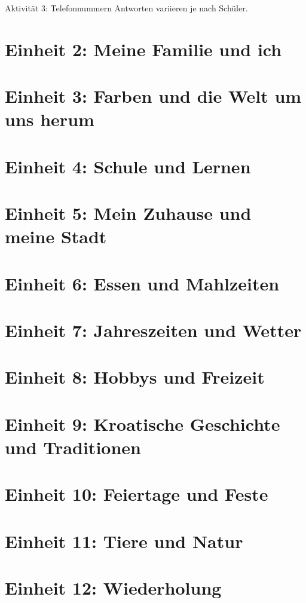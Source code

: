 Aktivität 3: Telefonnummern
Antworten variieren je nach Schüler.

\section{Einheit 2: Meine Familie und ich}

\section{Einheit 3: Farben und die Welt um uns herum}

\section{Einheit 4: Schule und Lernen}

\section{Einheit 5: Mein Zuhause und meine Stadt}

\section{Einheit 6: Essen und Mahlzeiten}

\section{Einheit 7: Jahreszeiten und Wetter}

\section{Einheit 8: Hobbys und Freizeit}

\section{Einheit 9: Kroatische Geschichte und Traditionen}

\section{Einheit 10: Feiertage und Feste}

\section{Einheit 11: Tiere und Natur}

\section{Einheit 12: Wiederholung}
